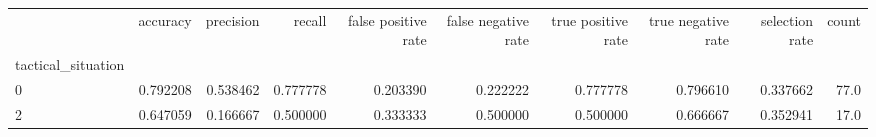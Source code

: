 \begin{tabular}{lrrrrrrrrr}
\toprule
{} &  accuracy &  precision &    recall &  false positive rate &  false negative rate &  true positive rate &  true negative rate &  selection rate &  count \\
tactical\_situation &           &            &           &                      &                      &                     &                     &                 &        \\
\midrule
0                  &  0.792208 &   0.538462 &  0.777778 &             0.203390 &             0.222222 &            0.777778 &            0.796610 &        0.337662 &   77.0 \\
2                  &  0.647059 &   0.166667 &  0.500000 &             0.333333 &             0.500000 &            0.500000 &            0.666667 &        0.352941 &   17.0 \\
\bottomrule
\end{tabular}
